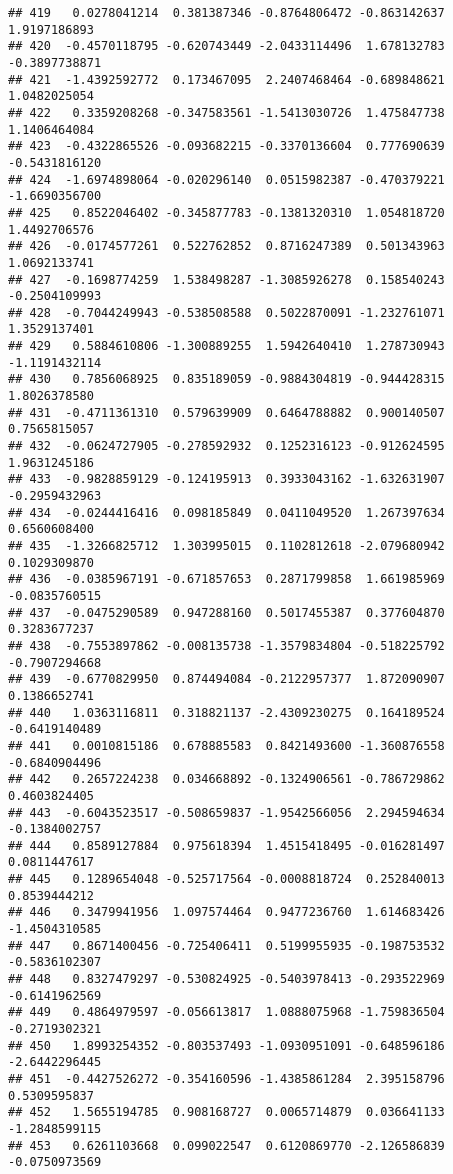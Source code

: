 \documentclass[
]{article}
\begin{document}
\begin{verbatim}
## 419   0.0278041214  0.381387346 -0.8764806472 -0.863142637  1.9197186893
## 420  -0.4570118795 -0.620743449 -2.0433114496  1.678132783 -0.3897738871
## 421  -1.4392592772  0.173467095  2.2407468464 -0.689848621  1.0482025054
## 422   0.3359208268 -0.347583561 -1.5413030726  1.475847738  1.1406464084
## 423  -0.4322865526 -0.093682215 -0.3370136604  0.777690639 -0.5431816120
## 424  -1.6974898064 -0.020296140  0.0515982387 -0.470379221 -1.6690356700
## 425   0.8522046402 -0.345877783 -0.1381320310  1.054818720  1.4492706576
## 426  -0.0174577261  0.522762852  0.8716247389  0.501343963  1.0692133741
## 427  -0.1698774259  1.538498287 -1.3085926278  0.158540243 -0.2504109993
## 428  -0.7044249943 -0.538508588  0.5022870091 -1.232761071  1.3529137401
## 429   0.5884610806 -1.300889255  1.5942640410  1.278730943 -1.1191432114
## 430   0.7856068925  0.835189059 -0.9884304819 -0.944428315  1.8026378580
## 431  -0.4711361310  0.579639909  0.6464788882  0.900140507  0.7565815057
## 432  -0.0624727905 -0.278592932  0.1252316123 -0.912624595  1.9631245186
## 433  -0.9828859129 -0.124195913  0.3933043162 -1.632631907 -0.2959432963
## 434  -0.0244416416  0.098185849  0.0411049520  1.267397634  0.6560608400
## 435  -1.3266825712  1.303995015  0.1102812618 -2.079680942  0.1029309870
## 436  -0.0385967191 -0.671857653  0.2871799858  1.661985969 -0.0835760515
## 437  -0.0475290589  0.947288160  0.5017455387  0.377604870  0.3283677237
## 438  -0.7553897862 -0.008135738 -1.3579834804 -0.518225792 -0.7907294668
## 439  -0.6770829950  0.874494084 -0.2122957377  1.872090907  0.1386652741
## 440   1.0363116811  0.318821137 -2.4309230275  0.164189524 -0.6419140489
## 441   0.0010815186  0.678885583  0.8421493600 -1.360876558 -0.6840904496
## 442   0.2657224238  0.034668892 -0.1324906561 -0.786729862  0.4603824405
## 443  -0.6043523517 -0.508659837 -1.9542566056  2.294594634 -0.1384002757
## 444   0.8589127884  0.975618394  1.4515418495 -0.016281497  0.0811447617
## 445   0.1289654048 -0.525717564 -0.0008818724  0.252840013  0.8539444212
## 446   0.3479941956  1.097574464  0.9477236760  1.614683426 -1.4504310585
## 447   0.8671400456 -0.725406411  0.5199955935 -0.198753532 -0.5836102307
## 448   0.8327479297 -0.530824925 -0.5403978413 -0.293522969 -0.6141962569
## 449   0.4864979597 -0.056613817  1.0888075968 -1.759836504 -0.2719302321
## 450   1.8993254352 -0.803537493 -1.0930951091 -0.648596186 -2.6442296445
## 451  -0.4427526272 -0.354160596 -1.4385861284  2.395158796  0.5309595837
## 452   1.5655194785  0.908168727  0.0065714879  0.036641133 -1.2848599115
## 453   0.6261103668  0.099022547  0.6120869770 -2.126586839 -0.0750973569

\end{verbatim}
\end{document}

